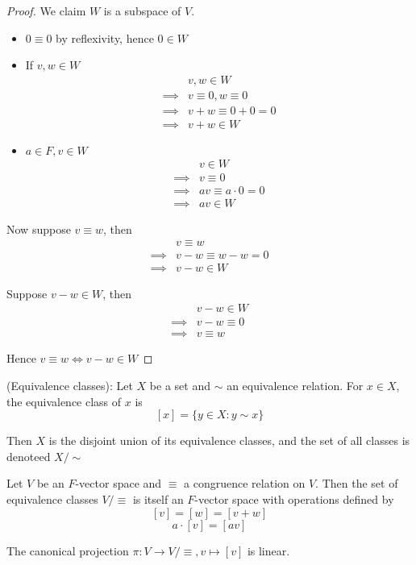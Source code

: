 \begin{proof}
    We claim $W$ is a subspace of $V$. 
    \begin{itemize}
        \item $0 \equiv 0$ by reflexivity, hence $0 \in W$ 
        \item If $v, w \in W$ 
        \begin{align*}
            & v, w \in W \\
            \implies & v \equiv 0, w \equiv 0 \\
            \implies & v + w \equiv 0 + 0 = 0 \\
            \implies & v + w \in W
        \end{align*}
        \item $a \in F, v \in W$
        \begin{align*}
            & v \in W \\
            \implies & v \equiv 0 \\
            \implies & av \equiv a \cdot 0 = 0 \\
            \implies & av \in W
        \end{align*}
    \end{itemize} 
    Now suppose $v \equiv w$, then 
    \begin{align*}
        & v \equiv w  \\
        \implies & v - w \equiv w - w = 0 \\
        \implies & v - w \in W
    \end{align*}

    Suppose $v - w \in W$, then 
    \begin{align*}
        & v - w \in W \\
        \implies & v - w \equiv 0 \\
        \implies & v \equiv w
    \end{align*}

    Hence $v \equiv w \iff v - w \in W$
\end{proof}

\begin{definition}
    (Equivalence classes): Let $X$ be a set and $\sim$ an equivalence relation. For $x \in X$, the equivalence class of $x$ is 
    \[
        \left[ x \right] = \{ y \in X : y \sim x \} 
    \]

    Then $X$ is the disjoint union of its equivalence classes, and the set of all classes is denoteed $X / \sim$
\end{definition}

\begin{proposition}
    Let $V$ be an $F$-vector space and $\equiv$ a congruence relation on $V$. Then the set of equivalence classes $V / \equiv$ is itself an $F$-vector space with operations defined by 
    \[
        \left[ v \right]  = \left[ w \right]  = \left[ v + w \right] 
    \]
    \[
        a \cdot \left[ v \right]  = \left[ av \right] 
    \]

    The canonical projection $\pi: V \to V /\equiv, v \mapsto \left[ v \right] $  is linear. 
\end{proposition}

